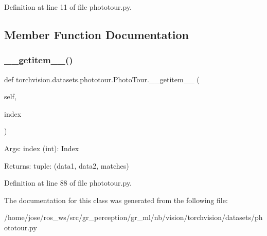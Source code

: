 Definition at line 11 of file phototour.\+py.



\subsection{Member Function Documentation}
\mbox{\label{classtorchvision_1_1datasets_1_1phototour_1_1PhotoTour_ae119a9f9f84400c0a10039457023311b}} 
\subsubsection{\texorpdfstring{\+\_\+\+\_\+getitem\+\_\+\+\_\+()}{\_\_getitem\_\_()}}
{\footnotesize\ttfamily def torchvision.\+datasets.\+phototour.\+Photo\+Tour.\+\_\+\+\_\+getitem\+\_\+\+\_\+ (\begin{DoxyParamCaption}\item[{}]{self,  }\item[{}]{index }\end{DoxyParamCaption})}

\begin{DoxyVerb}Args:
    index (int): Index

Returns:
    tuple: (data1, data2, matches)
\end{DoxyVerb}
 

Definition at line 88 of file phototour.\+py.



The documentation for this class was generated from the following file\+:\begin{DoxyCompactItemize}
\item 
/home/jose/ros\+\_\+ws/src/gr\+\_\+perception/gr\+\_\+ml/nb/vision/torchvision/datasets/phototour.\+py\end{DoxyCompactItemize}
